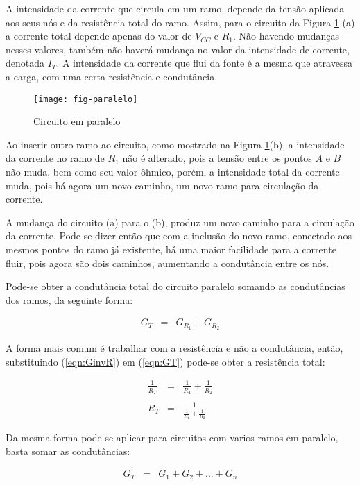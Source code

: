 A intensidade da corrente que circula em um ramo, depende da tensão aplicada aos seus nós e da resistência total do ramo. Assim, para o circuito da Figura \ref{fig:paralelo} (a) a corrente total depende apenas do valor de $V_{CC}$ e $R_1$. Não havendo mudanças nesses valores, também não haverá mudança no valor da intensidade de corrente, denotada $I_T$. A intensidade da corrente que flui da fonte é a mesma que atravessa a carga, com uma certa resistência e condutância.

\begin{figure}[!h]
	\centering
	\caption{Circuito em paralelo}
	\texttt{[image: fig-paralelo]}
	\label{fig:paralelo}
\end{figure}

Ao inserir outro ramo ao circuito, como mostrado na Figura \ref{fig:paralelo}(b), a intensidade da corrente no ramo de $R_1$ não é alterado, pois a tensão entre os pontos $A$ e $B$ não muda, bem como seu valor ôhmico, porém, a intensidade total da corrente muda, pois há agora um novo caminho, um novo ramo para circulação da corrente.

A mudança do circuito (a) para o (b), produz um novo caminho para a circulação da corrente. Pode-se dizer então que com a inclusão do novo ramo, conectado aos mesmos pontos do ramo já existente, há uma maior facilidade para a corrente fluir, pois agora são dois caminhos, aumentando a condutância entre os nós.

Pode-se obter a condutância total do circuito paralelo somando as condutâncias dos ramos, da seguinte forma:

\begin{eqnarray}
  G_T & = & G_{R_1} + G_{R_2}
\label{eqn:GT}
\end{eqnarray}

A forma mais comum é trabalhar com a resistência e não a condutância, então,
substituindo (\ref{eqn:GinvR}) em (\ref{eqn:GT}) pode-se obter a resistência total:

\begin{eqnarray}
  \frac{1}{R_T}	& = & \frac{1}{R_1} + \frac{1}{R_2} \nonumber\\
	\nonumber\\
	R_T & = & \frac{1}{\frac{1}{R_1} + \frac{1}{R_2} }
	\label{eq:paralelo}
\end{eqnarray}


Da mesma forma pode-se aplicar para circuitos com varios ramos em paralelo, basta somar as condutâncias:

\begin{eqnarray}
	G_T & = & G_1 + G_2 + ... + G_n
\end{eqnarray}

